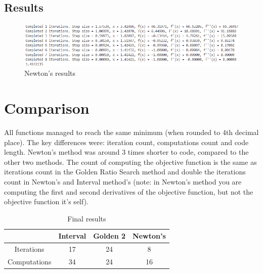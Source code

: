 \documentclass{article}
\begin{document}
        \subsection*{Results}
            \begin{figure}[H]
                \centering
                \includegraphics[width=1\textwidth]{newton.png}
                \caption{Newton's results}
                \label{fig:ml}
            \end{figure}
    \section{Comparison}
        All functions managed to reach the same minimum (when rounded to 4th decimal place). The key differences were: iteration count, computations count and code length. Newton's method was around 3 times shorter to code, compared to the other two methods. The count of computing the objective function is the same as iterations count in the Golden Ratio Search method and double the iterations count in Newton's and Interval method's (note: in Newton's method you are computing the first and second derivatives of the objective function, but not the objective function it's self).
        \begin{table}[h!]
            \centering
            \begin{tabular}{|c|c|c|c|}
            \hline
            & Interval & Golden 2 & Newton's \\
            \hline
            Iterations & 17 & 24 & 8 \\
            \hline
            Computations& 34 & 24 & 16 \\
            \hline
            \end{tabular}
            \caption{Final results}
        \end{table}
\end{document}
